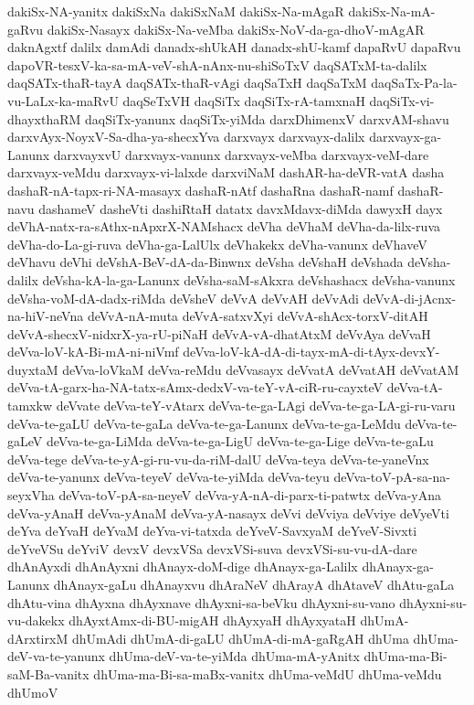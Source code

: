 {dakiSx-NA-yanitx
dakiSxNa
dakiSxNaM
dakiSx-Na-mAgaR
dakiSx-Na-mA-gaRvu
dakiSx-Nasayx
dakiSx-Na-veMba
dakiSx-NoV-da-ga-dhoV-mAgAR
daknAgxtf
dalilx
damAdi
danadx-shUkAH
danadx-shU-kamf
dapaRvU
dapaRvu
dapoVR-tesxV-ka-sa-mA-veV-shA-nAnx-nu-shiSoTxV
daqSATxM-ta-dalilx
daqSATx-thaR-tayA
daqSATx-thaR-vAgi
daqSaTxH
daqSaTxM
daqSaTx-Pa-la-vu-LaLx-ka-maRvU
daqSeTxVH
daqSiTx
daqSiTx-rA-tamxnaH
daqSiTx-vi-dhayxthaRM
daqSiTx-yanunx
daqSiTx-yiMda
darxDhimenxV
darxvAM-shavu
darxvAyx-NoyxV-Sa-dha-ya-shecxYva
darxvayx
darxvayx-dalilx
darxvayx-ga-Lanunx
darxvayxvU
darxvayx-vanunx
darxvayx-veMba
darxvayx-veM-dare
darxvayx-veMdu
darxvayx-vi-lalxde
darxviNaM
dashAR-ha-deVR-vatA
dasha
dashaR-nA-tapx-ri-NA-masayx
dashaR-nAtf
dashaRna
dashaR-namf
dashaR-navu
dashameV
dasheVti
dashiRtaH
datatx
davxMdavx-diMda
dawyxH
dayx
deVhA-natx-ra-sAthx-nApxrX-NAMshacx
deVha
deVhaM
deVha-da-lilx-ruva
deVha-do-La-gi-ruva
deVha-ga-LalUlx
deVhakekx
deVha-vanunx
deVhaveV
deVhavu
deVhi
deVshA-BeV-dA-da-Binwnx
deVsha
deVshaH
deVshada
deVsha-dalilx
deVsha-kA-la-ga-Lanunx
deVsha-saM-sAkxra
deVshashacx
deVsha-vanunx
deVsha-voM-dA-dadx-riMda
deVsheV
deVvA
deVvAH
deVvAdi
deVvA-di-jAcnx-na-hiV-neVna
deVvA-nA-muta
deVvA-satxvXyi
deVvA-shAcx-torxV-ditAH
deVvA-shecxV-nidxrX-ya-rU-piNaH
deVvA-vA-dhatAtxM
deVvAya
deVvaH
deVva-loV-kA-Bi-mA-ni-niVmf
deVva-loV-kA-dA-di-tayx-mA-di-tAyx-devxY-duyxtaM
deVva-loVkaM
deVva-reMdu
deVvasayx
deVvatA
deVvatAH
deVvatAM
deVva-tA-garx-ha-NA-tatx-sAmx-dedxV-va-teY-vA-ciR-ru-cayxteV
deVva-tA-tamxkw
deVvate
deVva-teY-vAtarx
deVva-te-ga-LAgi
deVva-te-ga-LA-gi-ru-varu
deVva-te-gaLU
deVva-te-gaLa
deVva-te-ga-Lanunx
deVva-te-ga-LeMdu
deVva-te-gaLeV
deVva-te-ga-LiMda
deVva-te-ga-LigU
deVva-te-ga-Lige
deVva-te-gaLu
deVva-tege
deVva-te-yA-gi-ru-vu-da-riM-dalU
deVva-teya
deVva-te-yaneVnx
deVva-te-yanunx
deVva-teyeV
deVva-te-yiMda
deVva-teyu
deVva-toV-pA-sa-na-seyxVha
deVva-toV-pA-sa-neyeV
deVva-yA-nA-di-parx-ti-patwtx
deVva-yAna
deVva-yAnaH
deVva-yAnaM
deVva-yA-nasayx
deVvi
deVviya
deVviye
deVyeVti
deYva
deYvaH
deYvaM
deYva-vi-tatxda
deYveV-SavxyaM
deYveV-Sivxti
deYveVSu
deYviV
devxV
devxVSa
devxVSi-suva
devxVSi-su-vu-dA-dare
dhAnAyxdi
dhAnAyxni
dhAnayx-doM-dige
dhAnayx-ga-Lalilx
dhAnayx-ga-Lanunx
dhAnayx-gaLu
dhAnayxvu
dhAraNeV
dhArayA
dhAtaveV
dhAtu-gaLa
dhAtu-vina
dhAyxna
dhAyxnave
dhAyxni-sa-beVku
dhAyxni-su-vano
dhAyxni-su-vu-dakekx
dhAyxtAmx-di-BU-migAH
dhAyxyaH
dhAyxyataH
dhUmA-dArxtirxM
dhUmAdi
dhUmA-di-gaLU
dhUmA-di-mA-gaRgAH
dhUma
dhUma-deV-va-te-yanunx
dhUma-deV-va-te-yiMda
dhUma-mA-yAnitx
dhUma-ma-Bi-saM-Ba-vanitx
dhUma-ma-Bi-sa-maBx-vanitx
dhUma-veMdU
dhUma-veMdu
dhUmoV
}
